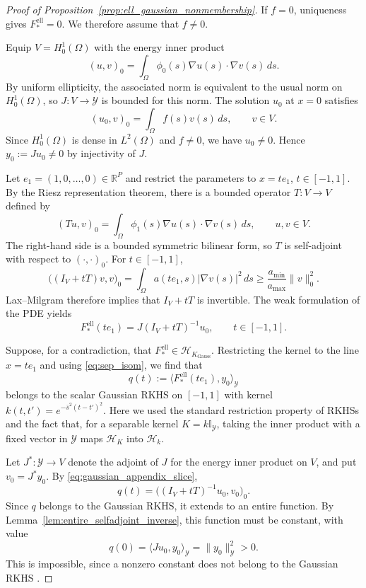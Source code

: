 \documentclass[11pt]{article}
\numberwithin{equation}{section}
\theoremstyle{plain}
\theoremstyle{definition}
\theoremstyle{remark}
\newenvironment{namedproof}[1]{\begin{proof}[#1]}{\end{proof}}
\newcommand{\Hs}{\mathcal{H}}
\newcommand{\Y}{\mathcal{Y}}
\newcommand{\I}{\mathbb{I}}
\begin{document}
\begin{namedproof}{Proof of Proposition~\ref{prop:ell_gaussian_nonmembership}}
If $f=0$, uniqueness gives $F_*^{\mathrm{ell}}=0$. We therefore
assume that $f\neq0$.

Equip $V=H_0^1(\Omega)$ with the energy inner product
\[
(u,v)_0=\int_\Omega\phi_0(s)\nabla u(s)\cdot\nabla v(s)\,ds.
\]
By uniform ellipticity, the associated norm is equivalent to the
usual norm on $H_0^1(\Omega)$, so $J:V\to\Y$ is bounded for this
norm. The solution $u_0$ at $x=0$ satisfies
\[
(u_0,v)_0=\int_\Omega f(s)v(s)\,ds,
\qquad v\in V.
\]
Since $H_0^1(\Omega)$ is dense in $L^2(\Omega)$ and $f\neq0$, we
have $u_0\neq0$. Hence $y_0:=Ju_0\neq0$ by injectivity of $J$.

Let $e_1=(1,0,\ldots,0)\in\mathbb R^P$ and restrict the parameters
to $x=te_1$, $t\in[-1,1]$. By the Riesz representation theorem,
there is a bounded operator $T:V\to V$ defined by
\[
(Tu,v)_0=\int_\Omega\phi_1(s)\nabla u(s)\cdot\nabla v(s)\,ds,
\qquad u,v\in V.
\]
The right-hand side is a bounded symmetric bilinear form, so $T$ is
self-adjoint with respect to $(\cdot,\cdot)_0$. For $t\in[-1,1]$,
\[
\bigl((I_V+tT)v,v\bigr)_0
=\int_\Omega a(te_1,s)|\nabla v(s)|^2\,ds
\geq\frac{a_{\mathrm{min}}}{a_{\mathrm{max}}}\|v\|_0^2.
\]
Lax--Milgram therefore implies that $I_V+tT$ is invertible.
The weak formulation of the PDE yields
\begin{equation}\label{eq:gaussian_appendix_slice}
F_*^{\mathrm{ell}}(te_1)=J(I_V+tT)^{-1}u_0,
\qquad t\in[-1,1].
\end{equation}

Suppose, for a contradiction, that
$F_*^{\mathrm{ell}}\in\Hs_{K_{\mathrm{Gauss}}}$.
Restricting the kernel to the line $x=te_1$ and using
\eqref{eq:sep_isom}, we find that
\[
q(t):=\bigl\langle F_*^{\mathrm{ell}}(te_1),y_0\bigr\rangle_\Y
\]
belongs to the scalar Gaussian RKHS on $[-1,1]$ with kernel
$k(t,t')=e^{-\bar s^2(t-t')^2}$. Here we used the standard restriction
property of RKHSs and the fact that, for a separable kernel
$K=k\I_\Y$, taking the inner product with a fixed vector in $\Y$
maps $\Hs_K$ into $\Hs_k$.

Let $J^*:\Y\to V$ denote the adjoint of $J$ for the energy inner
product on $V$, and put $v_0=J^*y_0$. By
\eqref{eq:gaussian_appendix_slice},
\[
q(t)=\bigl((I_V+tT)^{-1}u_0,v_0\bigr)_0.
\]
Since $q$ belongs to the Gaussian RKHS, it extends to an entire
function. By Lemma~\ref{lem:entire_selfadjoint_inverse}, this function
must be constant, with value
\[
q(0)=\langle Ju_0,y_0\rangle_\Y=\|y_0\|_\Y^2>0.
\]
This is impossible, since a nonzero constant does not belong to the
Gaussian RKHS \cite[Theorem~2]{minh2010some}.
\end{namedproof}
\end{document}
